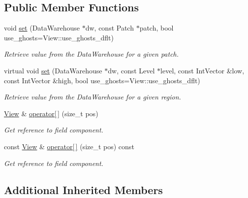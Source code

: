\subsection*{Public Member Functions}
\begin{DoxyCompactItemize}
\item 
void \hyperlink{classUintah_1_1PhaseField_1_1detail_1_1view__array_ac02634a707d1a4d12223a3af38a4cdbc}{set} (Data\+Warehouse $\ast$dw, const Patch $\ast$patch, bool use\+\_\+ghosts=View\+::use\+\_\+ghosts\+\_\+dflt)
\begin{DoxyCompactList}\small\item\em Retrieve value from the Data\+Warehouse for a given patch. \end{DoxyCompactList}\item 
virtual void \hyperlink{classUintah_1_1PhaseField_1_1detail_1_1view__array_a64949b6b13b385c9eb2b2e12f10294a0}{set} (Data\+Warehouse $\ast$dw, const Level $\ast$level, const Int\+Vector \&low, const Int\+Vector \&high, bool use\+\_\+ghosts=View\+::use\+\_\+ghosts\+\_\+dflt)
\begin{DoxyCompactList}\small\item\em Retrieve value from the Data\+Warehouse for a given region. \end{DoxyCompactList}\item 
\hyperlink{namespaceUintah_1_1PhaseField_a59210a1e28eba254d428762c92ddeabb}{View} \& \hyperlink{classUintah_1_1PhaseField_1_1detail_1_1view__array_a5f4495be42ef2dbe399b717c09766f0d}{operator\mbox{[}$\,$\mbox{]}} (size\+\_\+t pos)
\begin{DoxyCompactList}\small\item\em Get reference to field component. \end{DoxyCompactList}\item 
const \hyperlink{namespaceUintah_1_1PhaseField_a59210a1e28eba254d428762c92ddeabb}{View} \& \hyperlink{classUintah_1_1PhaseField_1_1detail_1_1view__array_a3f995548be07fb11a5db1cdd8cc7b6f4}{operator\mbox{[}$\,$\mbox{]}} (size\+\_\+t pos) const
\begin{DoxyCompactList}\small\item\em Get reference to field component. \end{DoxyCompactList}\end{DoxyCompactItemize}
\subsection*{Additional Inherited Members}


